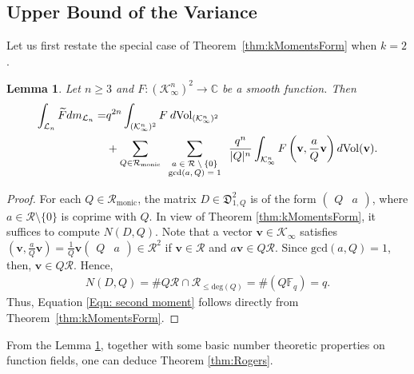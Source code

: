 \documentclass[11pt,a4paper,reqno]{amsart}
\def\gcd{\mathrm{gcd}}
\def\deg{\mathrm{deg}}
\def\vol{\mathrm{Vol}}
\newcommand{\Rmo}{\mathcal R_{\text{monic}}}
\newtheorem{lemma}[theorem]{Lemma}
\theoremstyle{definition}
\theoremstyle{remark}
\numberwithin{equation}{section}
\begin{document}
\subsection{Upper Bound of the Variance}
Let us first restate the special case of Theorem~\ref{thm:kMomentsForm} when $k=2$.
\begin{lemma}\label{lem:Rogers2nd} Let $n\ge 3$ and $F:(\mathcal K_\infty^n)^2\rightarrow \mathbb C$ be a smooth function. Then
\begin{equation}\label{Eqn: second moment}\begin{split}
    \int_{\mathcal L_n} \widetilde{F} dm_{\mathcal L_n}
    =&q^{2n} \int_{(\mathcal K_\infty^n)^2} F \:d\vol_{(\mathcal K_\infty^n)^2}\\
    &+\sum_{Q\in \Rmo}
    \sum_{\scriptsize \begin{array}{c}
    a\in \mathcal R\setminus \{0\}\\
    \gcd(a,Q)=1
    \end{array}} \frac {q^n}{|Q|^n} \int_{\mathcal K_\infty^n} F\left(\mathbf v, \frac {a} {Q}\mathbf v\right) d\vol(\mathbf v).
\end{split}\end{equation}
\end{lemma}
\begin{proof}
For each $Q\in \Rmo$, the matrix $D\in \mathfrak D^2_{1,Q}$ is of the form $\begin{pmatrix} Q & a\end{pmatrix}$, where $a\in \mathcal R\setminus \{0\}$ is coprime with $Q$.
In view of Theorem \ref{thm:kMomentsForm}, it suffices to compute $N(D,Q)$. Note that a vector $\mathbf{v}\in \mathcal{K}_{\infty}$ satisfies $\left(\mathbf{v},\frac{a}{Q}\mathbf{v}\right)=\frac{1}{Q}\mathbf{v}\begin{pmatrix}
    Q&a
\end{pmatrix}\in \mathcal{R}^2$ if $\mathbf{v}\in \mathcal{R}$ and $a\mathbf{v}\in Q\mathcal{R}$. Since $\gcd(a,Q)=1$, then, $\mathbf{v}\in Q\mathcal{R}$. Hence, 
\begin{equation}
\begin{split}
    N(D,Q)=\#Q\mathcal{R} \cap \mathcal{R}_{\leq \deg(Q)}=\#(Q\mathbb{F}_q)=q.
\end{split}
\end{equation}
Thus, Equation \eqref{Eqn: second moment} follows directly from Theorem~\ref{thm:kMomentsForm}.
\end{proof}

From the Lemma \ref{lem:Rogers2nd}, together with some basic number theoretic properties on function fields, one can deduce Theorem \ref{thm:Rogers}. 
\end{document}
